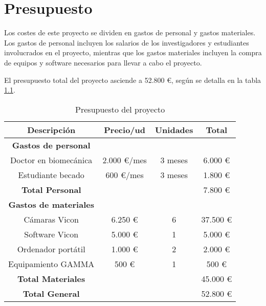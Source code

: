 \chapter{Presupuesto} \label{sec:cap4}

\noindent Los costes de este proyecto se dividen en gastos de personal y gastos materiales. Los gastos de personal incluyen los salarios de los investigadores y estudiantes involucrados en el proyecto, mientras que los gastos materiales incluyen la compra de equipos y software necesarios para llevar a cabo el proyecto.

El presupuesto total del proyecto asciende a 52.800 €, según se detalla en la tabla \ref{tab:presupuesto}.

\begin{table}[H]
    \centering
    \begin{tabular}{cccc}
    \toprule
    {\textbf{Descripción}} & {\textbf{Precio/ud}} & {\textbf{Unidades}} & {\textbf{Total}} \\
    \midrule
    \textbf{Gastos de personal} & & & \\
    Doctor en biomecánica & 2.000 €/mes & 3 meses & 6.000 € \\
    Estudiante becado & 600 €/mes & 3 meses & 1.800 € \\
    \hline
    \textbf{Total Personal} & & & 7.800 € \\
    \hline
    \textbf{Gastos de materiales} & & & \\
    Cámaras Vicon & 6.250 € & 6 & 37.500 € \\
    Software Vicon & 5.000 € & 1 & 5.000 € \\
    Ordenador portátil & 1.000 € & 2 & 2.000 € \\
    Equipamiento \ac{GAMMA} & 500 € & 1 & 500 € \\
    \hline
    \textbf{Total Materiales} & & & 45.000 € \\
    \hline
    \textbf{Total General} & & & 52.800 € \\
    \bottomrule
    \end{tabular}
    \caption{Presupuesto del proyecto}
    \label{tab:presupuesto}
  \end{table}
